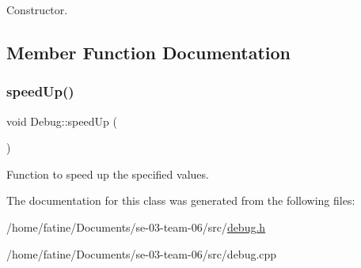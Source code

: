 Constructor. 

\subsection{Member Function Documentation}
\mbox{\label{classDebug_a4c42705f755444daa2a22b000a561e01}} 
\subsubsection{\texorpdfstring{speed\+Up()}{speedUp()}}
{\footnotesize\ttfamily void Debug\+::speed\+Up (\begin{DoxyParamCaption}{ }\end{DoxyParamCaption})}

Function to speed up the specified values. 

The documentation for this class was generated from the following files\+:\begin{DoxyCompactItemize}
\item 
/home/fatine/\+Documents/se-\/03-\/team-\/06/src/\hyperlink{debug_8h}{debug.\+h}\item 
/home/fatine/\+Documents/se-\/03-\/team-\/06/src/debug.\+cpp\end{DoxyCompactItemize}
